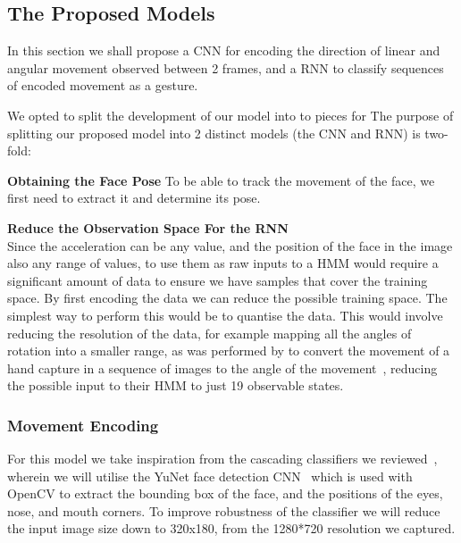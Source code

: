 \subsection{The Proposed Models} %
In this section we shall propose a CNN for encoding the direction of linear and angular movement observed between 2 frames, and a RNN to classify sequences of encoded movement as a gesture.

We opted to split the development of our model into to pieces for 
The purpose of splitting our proposed model into 2 distinct models (the CNN and RNN) is two-fold:

\nl\textbf{Obtaining the Face Pose}\nl
To be able to track the movement of the face, we first need to extract it and determine its pose.

\nl\textbf{Reduce the Observation Space For the RNN}\\
Since the acceleration can be any value, and the position of the face in the image also any range of values, to use them as raw inputs to a HMM would require a significant amount of data to ensure we have samples that cover the training space.
By first encoding the data we can reduce the possible training space.
The simplest way to perform this would be to quantise the data. This would involve reducing the resolution of the data, for example mapping all the angles of rotation into a smaller range, as was performed by \citeauthor{elmezain2008hidden} to convert the movement of a hand capture in a sequence of images to the angle of the movement~\cite{elmezain2008hidden}, reducing the possible input to their HMM to just 19 observable states.

\subsubsection{Movement Encoding}\nl
For this model we take inspiration from the cascading classifiers we reviewed~\cite{kim2017real, neto2012real, francone2011using,viola2004robust}, wherein we will utilise the YuNet face detection CNN~\cite{yu2022yunet} which is used with OpenCV to extract the bounding box of the face, and the positions of the eyes, nose, and mouth corners. To improve robustness of the classifier we will reduce the input image size down to 320x180, from the 1280*720 resolution we captured.

